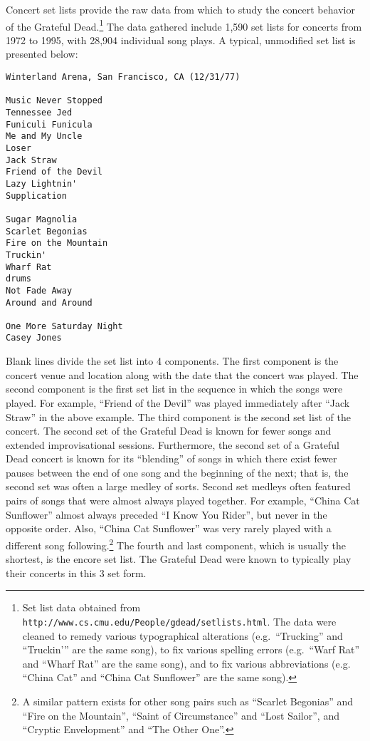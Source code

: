 \documentclass{svmult}
\newcommand{\ttt}[1]{``#1''}
\begin{document}
Concert set lists provide the raw data from which to study the concert behavior of the Grateful Dead.\footnote{Set list data obtained from \texttt{http://www.cs.cmu.edu/People/gdead/setlists.html}. The data were cleaned to remedy various typographical alterations (e.g.~\ttt{Trucking} and \ttt{{Truckin'}} are the same song), to fix various spelling errors (e.g.~\ttt{Warf Rat} and \ttt{Wharf Rat} are the same song), and to fix various abbreviations (e.g. \ttt{China Cat} and \ttt{China Cat Sunflower} are the same song).} The data gathered include 1,590 set lists for concerts from 1972 to 1995, with 28,904 individual song plays. A typical, unmodified set list is presented below:
\begin{footnotesize}
\begin{verbatim}
Winterland Arena, San Francisco, CA (12/31/77)

Music Never Stopped
Tennessee Jed
Funiculi Funicula
Me and My Uncle
Loser
Jack Straw
Friend of the Devil
Lazy Lightnin'
Supplication

Sugar Magnolia
Scarlet Begonias
Fire on the Mountain
Truckin'
Wharf Rat
drums
Not Fade Away
Around and Around

One More Saturday Night
Casey Jones
\end{verbatim}
\end{footnotesize}
Blank lines divide the set list into 4 components. The first component is the concert venue and location along with the date that the concert was played. The second component is the first set list in the sequence in which the songs were played. For example, \ttt{Friend of the Devil} was played immediately after \ttt{Jack Straw} in the above example. The third component is the second set list of the concert. The second set of the Grateful Dead is known for fewer songs and extended improvisational sessions. Furthermore, the second set of a Grateful Dead concert is known for its ``blending'' of songs in which there exist fewer pauses between the end of one song and the beginning of the next; that is, the second set was often a large medley of sorts.  Second set medleys often featured pairs of songs that were almost always played together.  For example, \ttt{China Cat Sunflower} almost always preceded \ttt{I Know You Rider}, but never in the opposite order.  Also, \ttt{China Cat Sunflower} was very rarely played with a different song following.\footnote{A similar pattern exists for other song pairs such as \ttt{Scarlet Begonias} and \ttt{Fire on the Mountain}, \ttt{Saint of Circumstance} and \ttt{Lost Sailor}, and \ttt{Cryptic Envelopment} and \ttt{The Other One}.}  The fourth and last component, which is usually the shortest, is the encore set list. The Grateful Dead were known to typically play their concerts in this 3 set form.  
\end{document}
